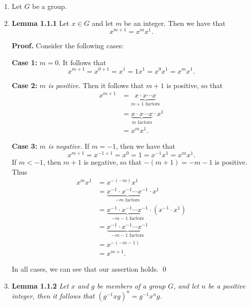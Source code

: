 \begin{enumerate}
   \item[]        Let $G$ be a group.
   \item[]        \textbf{Lemma 1.1.1} Let $x \in G$ and let $m$ be an integer.
                  Then we have that
                  $$x^{m+1} = x^mx^1.$$

      \textbf{Proof.}  Consider the following cases:

      \textbf{Case 1:} \textit{$m = 0$}. It follows that
      $$x^{m+1} = x^{0+1} = x^1 = 1x^1 = x^0x^1 = x^mx^1.$$

      \textbf{Case 2:} \textit{$m$ is positive.} Then it follows that $m + 1$ is 
      positive, so that
      \begin{align*}
         x^{m + 1} &= \underbrace{x \cdot x \cdots x}_{m+1\text{ factors}} \\
            &= \underbrace{x \cdot x \cdots x}_{m\text{ factors}} \cdot x^1 \\
            &= x^mx^1.
      \end{align*}

      \textbf{Case 3:} \textit{$m$ is negative.} If $m = -1$, then we have that
      $$x^{m+1} = x^{-1+1} = x^0 = 1 = x^{-1}x^1 = x^mx^1.$$
      If $m < -1$, then $m + 1$ is negative, so that $-(m + 1) = -m - 1$ is 
      positive. Thus
      \begin{align*}
         x^mx^1 &= x^{-(-m)}x^1 \\
                &= \underbrace{x^{-1} \cdot x^{-1} \cdots x^{-1}}_{
                   -m\text{ factors}} \cdot x^1 \\
                &= \underbrace{x^{-1} \cdot x^{-1} \cdots x^{-1}}_{
                   -m-1\text{ factors}} \cdot (x^{-1} \cdot x^1) \\
                &= \underbrace{x^{-1} \cdot x^{-1} \cdots x^{-1}}_{
                   -m-1\text{ factors}} \\
                &= x^{-(-m-1)} \\
                &= x^{m+1}.
      \end{align*}

      In all cases, we can see that our assertion holds. \qed
   \item[]        \textbf{Lemma 1.1.2} \textit{Let $x$ and $g$ be members of a 
                  group $G$, and let $n$ be a positive integer, then it follows 
                  that $(g^{-1}xg)^n = g^{-1}x^ng$.}


\end{enumerate}
